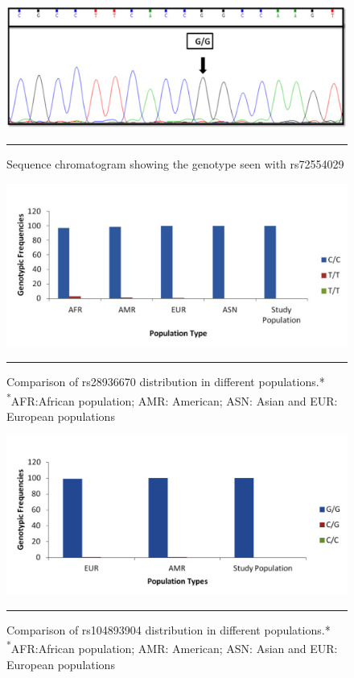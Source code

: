 \begin{refsection}
\begin{figure}[!htb]
\centering
\includegraphics[width=\linewidth]{Figures/Figure5_8.pdf}
\rule{35em}{0.5pt}
\caption{Sequence chromatogram showing the genotype seen with rs72554029}
\label{fig:5_8}
\end{figure}


\begin{figure}[!htb]
\centering
\includegraphics[width=\linewidth]{Figures/Figure5_10.pdf}
\rule{35em}{0.5pt}
\caption{Comparison of rs28936670 distribution in different populations.*\\ {\textsuperscript{*}\footnotesize{AFR:African population; AMR: American; ASN: Asian and EUR: European populations}}}
\label{fig:5_10}
\end{figure}

\begin{figure}[!htb]
\centering
\includegraphics[width=\linewidth]{Figures/Figure5_11.pdf}
\rule{35em}{0.5pt}
\caption{Comparison of rs104893904 distribution in different populations.*\\{\textsuperscript{*}\footnotesize{AFR:African population; AMR: American; ASN: Asian and EUR: European populations}}}
\label{fig:5_11}
\end{figure}


\end{refsection}
